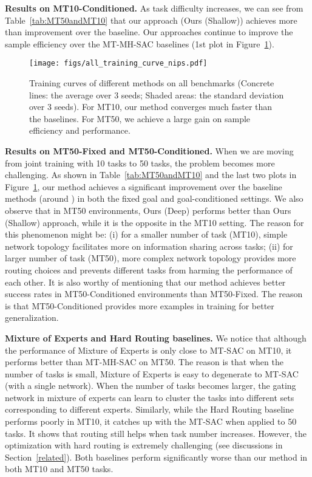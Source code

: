 \documentclass{article}
\begin{document}
\textbf{Results on MT10-Conditioned.} As task difficulty increases, we can see from Table~\ref{tab:MT50andMT10} that our approach (Ours (Shallow)) achieves more than  improvement over the baseline. Our approaches continue to improve the sample efficiency over the MT-MH-SAC baselines (1st plot in Figure~\ref{figure:general_comparison}). 

\begin{figure}[t]
\begin{center}
    \centering
        \texttt{[image: figs/all\_training\_curve\_nips.pdf]}
        \vspace{-0.25in}
        \caption{Training curves of different methods on all benchmarks (Concrete lines: the average over 3 seeds; Shaded areas: the standard deviation over 3 seeds). For MT10, our method converges much faster than the baselines. For MT50, we achieve a large gain on sample efficiency and performance.}
    \label{figure:general_comparison}
\end{center}
\vspace{-0.1in}
\end{figure}

\textbf{Results on MT50-Fixed and MT50-Conditioned.} When we are moving from joint training with 10 tasks to 50 tasks, the problem becomes more challenging. As shown in Table~\ref{tab:MT50andMT10} and the last two plots in Figure~\ref{figure:general_comparison}, our method achieves a significant improvement over the baseline methods (around ) in both the fixed goal and goal-conditioned settings. We also observe that in MT50 environments, Ours (Deep) performs better than Ours (Shallow) approach, while it is the opposite in the MT10 setting. The reason for this phenomenon might be: (i) for a smaller number of task (MT10), simple network topology facilitates more on information sharing across tasks; (ii) for larger number of task (MT50), more complex network topology provides more routing choices and prevents different tasks from harming the performance of each other. It is also worthy of mentioning that our method achieves better success rates in MT50-Conditioned environments than MT50-Fixed. The reason is that MT50-Conditioned provides more examples in training for better generalization.

\textbf{Mixture of Experts and Hard Routing baselines.} We notice that although the performance of Mixture of Experts is only close to MT-SAC on MT10, it performs better than MT-MH-SAC on MT50. The reason is that when the number of tasks is small, Mixture of Experts is easy to degenerate to MT-SAC (with a single network). When the number of tasks becomes larger, the gating network in mixture of experts can learn to cluster the tasks into different sets corresponding to different experts. Similarly, while the Hard Routing baseline performs poorly in MT10, it catches up with the MT-SAC when applied to 50 tasks. It shows that routing still helps when task number increases. However, the optimization with hard routing is extremely challenging (see discussions in Section~\ref{related}). Both baselines perform significantly worse than our method in both MT10 and MT50 tasks. 
\end{document}
